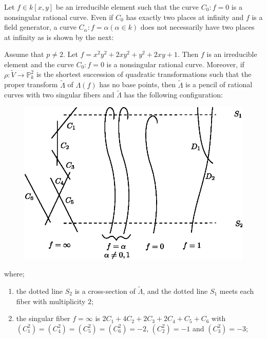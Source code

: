 \subsubsection{}\label{chap2:2.4.4}
Let $f\in k[x,y]$ be an irreducible element such that the curve
$C_{0}:f=0$ is a nonsingular rational curve. Even if $C_{0}$ has
exactly two places at infinity and $f$ is a field generator, a curve
$C_{\alpha}:f=\alpha(\alpha\in k)$ does not necessarily have two
places at infinity as is shown by the next:

\begin{example*}
Assume that $p\neq 2$. Let $f=x^{2}y^{2}+2xy^{2}+y^{2}+2xy+1$. Then
$f$ is an irreducible element and the curve $C_{0}:f=0$ is a
nonsingular rational curve. Moreover, if
$\rho:\widetilde{V}\to\mathbb{P}^{2}_{k}$ is the shortest succession
of quadratic transformations such that the proper transform
$\widetilde{\Lambda}$ of $\Lambda(f)$ has no base points, then
$\widetilde{\Lambda}$ is a pencil of rational curves with two singular
fibers and $\widetilde{\Lambda}$ has the following configuration:
\begin{figure}[H]
\centering
\includegraphics[scale=.8]{figures/chap2-fig2.eps}
\end{figure}
\noindent
where;\pageoriginale\
\begin{enumerate}
\renewcommand{\labelenumi}{\theenumi$^{\circ}$}
\item the dotted line $S_{2}$ is a cross-section of
  $\widetilde{\Lambda}$, and the dotted line $S_{1}$ meets each fiber
  with multiplicity $2$;

\item the singular fiber $f=\infty$ is
  $2C_{1}+4C_{2}+2C_{3}+2C_{4}+C_{5}+C_{6}$ with
  $(C^{2}_{1})=(C^{2}_{4})=(C^{2}_{5})=(C^{2}_{6})=-2$,
  $(C^{2}_{2})=-1$ and $(C^{2}_{3})=-3$;


\end{enumerate}
\end{example*}
